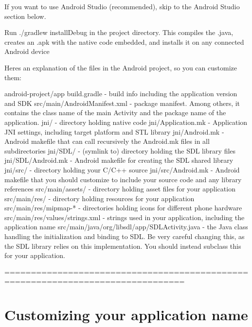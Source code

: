If you want to use Android Studio (recommended), skip to the Android Studio section below.


\begin{DoxyEnumerate}
\item Run \textquotesingle{}./gradlew install\+Debug\textquotesingle{} in the project directory. This compiles the .java, creates an .apk with the native code embedded, and installs it on any connected Android device
\end{DoxyEnumerate}

Here\textquotesingle{}s an explanation of the files in the Android project, so you can customize them\+: \begin{DoxyVerb}android-project/app
    build.gradle            - build info including the application version and SDK
    src/main/AndroidManifest.xml    - package manifest. Among others, it contains the class name
                  of the main Activity and the package name of the application.
    jni/            - directory holding native code
    jni/Application.mk  - Application JNI settings, including target platform and STL library
    jni/Android.mk      - Android makefile that can call recursively the Android.mk files in all subdirectories
    jni/SDL/        - (symlink to) directory holding the SDL library files
    jni/SDL/Android.mk  - Android makefile for creating the SDL shared library
    jni/src/        - directory holding your C/C++ source
    jni/src/Android.mk  - Android makefile that you should customize to include your source code and any library references
    src/main/assets/    - directory holding asset files for your application
    src/main/res/       - directory holding resources for your application
    src/main/res/mipmap-*   - directories holding icons for different phone hardware
    src/main/res/values/strings.xml - strings used in your application, including the application name
    src/main/java/org/libsdl/app/SDLActivity.java - the Java class handling the initialization and binding to SDL. Be very careful changing this, as the SDL library relies on this implementation. You should instead subclass this for your application.
\end{DoxyVerb}


================================================================================ \section*{Customizing your application name }

